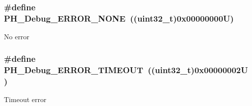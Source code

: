 \subsubsection[{\texorpdfstring{P\+H\+\_\+\+Debug\+\_\+\+E\+R\+R\+O\+R\+\_\+\+N\+O\+NE}{PH_Debug_ERROR_NONE}}]{\setlength{\rightskip}{0pt plus 5cm}\#define P\+H\+\_\+\+Debug\+\_\+\+E\+R\+R\+O\+R\+\_\+\+N\+O\+NE~((uint32\+\_\+t)0x00000000\+U)}\hypertarget{group___p_h___debug___error___code_ga25e714b84859b15002f51ca15a810102}{}\label{group___p_h___debug___error___code_ga25e714b84859b15002f51ca15a810102}
No error 
\subsubsection[{\texorpdfstring{P\+H\+\_\+\+Debug\+\_\+\+E\+R\+R\+O\+R\+\_\+\+T\+I\+M\+E\+O\+UT}{PH_Debug_ERROR_TIMEOUT}}]{\setlength{\rightskip}{0pt plus 5cm}\#define P\+H\+\_\+\+Debug\+\_\+\+E\+R\+R\+O\+R\+\_\+\+T\+I\+M\+E\+O\+UT~((uint32\+\_\+t)0x00000002\+U)}\hypertarget{group___p_h___debug___error___code_ga2404c547f870b71cff749676950a322f}{}\label{group___p_h___debug___error___code_ga2404c547f870b71cff749676950a322f}
Timeout error 